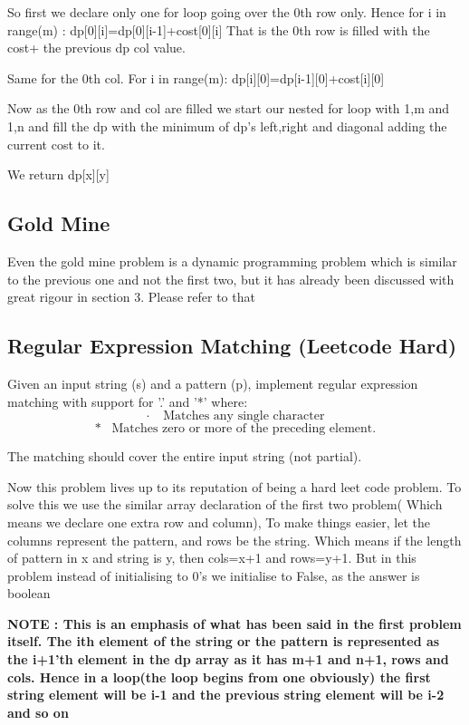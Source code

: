 \documentclass{article}
\newcommand{\nd}{\noindent}
\begin{document}
\nd So first we declare only one for loop going over the 0th row only. Hence for i in range(m) : dp[0][i]=dp[0][i-1]+cost[0][i]
That is the 0th row is filled with the cost+ the previous dp col value. 

\nd Same for the 0th col. For i in range(m): dp[i][0]=dp[i-1][0]+cost[i][0]

\nd Now as the 0th row and col are filled we start our nested for loop with 1,m and 1,n and fill the dp with the minimum of dp's left,right and diagonal adding the current cost to it. 

We return dp[x][y]

\subsection{Gold Mine} 

Even the gold mine problem is a dynamic programming problem which is similar to the previous one and not the first two, but it has already been discussed with great rigour in section 3. Please refer to that 

\subsection{Regular Expression Matching (Leetcode Hard)}
Given an input string (s) and a pattern (p), implement regular expression matching with support for '.' and '*' where: 
\begin{equation*}
\cdot \,\,\,\,\,\ \text{Matches any single character}
\end{equation*}
\begin{equation*}
* \,\,\,\,\, \text{Matches zero or more of the preceding element.}
\end{equation*}

The matching should cover the entire input string (not partial).

\nd Now this problem lives up to its reputation of being a hard leet code problem. To solve this we use the similar array declaration of the first two problem( Which means we declare one extra row and column), To make things easier, let the columns represent the pattern, and rows be the string. Which means if the length of pattern in x and string is y, then cols=x+1 and rows=y+1. But in this problem instead of initialising to 0's we initialise to False, as the answer is boolean

\nd \textbf{NOTE : This is an emphasis of what has been said in the first problem itself. The ith element of the string or the pattern is represented as the i+1'th element in the dp array as it has m+1 and n+1, rows and cols. Hence in a loop(the loop begins from one obviously) the first string element will be i-1 and the previous string element will be i-2 and so on}
\end{document}
